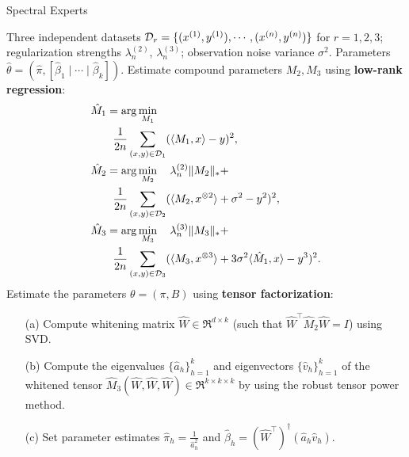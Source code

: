\begin{algorithm}[t]
  \caption{Spectral Experts}
  \label{algo:spectral-experts}
  \begin{algorithmic}[1]
    \INPUT Three independent datasets $\mathcal{D}_r = \{ (x^{(1)}, y^{(1)}), \cdots, (x^{(n)}, y^{(n)}) \}$ for $r = 1, 2, 3$;
    regularization strengths $\lambda_n^{(2)}$, $\lambda_n^{(3)}$;
    observation noise variance $\sigma^2$.
    \OUTPUT Parameters $\hat\theta = (\hat \pi, [\hat \beta_1 \mid \cdots \mid \hat \beta_k])$.
    \STATE Estimate compound parameters $M_2, M_3$ using \textbf{low-rank regression}:
    \begin{align}
      &\hat M_1 = \arg\min_{M_1} \label{eqn:estimateM1} \\
      &\quad\quad\frac{1}{2n} \sum_{(x,y) \in \mathcal{D}_1} (\langle M_1, x \rangle - y)^2, \nonumber \\
      &\hat M_2 = \arg\min_{M_2} \quad \lambda_n^{(2)} \|M_2\|_* + \label{eqn:estimateM2} \\
      &\quad\quad\frac{1}{2n} \sum_{(x,y) \in \mathcal{D}_2} (\langle M_2, x^{\otimes 2} \rangle + \sigma^2 - y^2)^2, \nonumber \\
      &\hat M_3 = \arg\min_{M_3} \quad \lambda_n^{(3)} \|M_3\|_* + \label{eqn:estimateM3} \\
      &\quad\quad\frac{1}{2n} \sum_{(x,y) \in \mathcal{D}_3} (\langle M_3, x^{\otimes 3} \rangle + 3 \sigma^2\langle \hat M_1, x \rangle - y^3)^2. \nonumber
    \end{align}
    \STATE Estimate the parameters $\theta = (\pi, B)$ using \textbf{tensor factorization}:
    \begin{enumerate}
      \item [(a)] Compute whitening matrix $\hat W \in \Re^{d \times k}$ (such that $\hat W^\top
      \hat M_2 \hat W = I$) using SVD.
      \item [(b)] Compute the eigenvalues $\{\hat a_h\}_{h=1}^k$
      and eigenvectors $\{\hat v_h\}_{h=1}^k$
      of the whitened tensor $\hat M_3(\hat W, \hat W, \hat W) \in \Re^{k \times k \times k}$
      by using the robust tensor power method.
    \item [(c)] Set parameter estimates $\hat\pi_h = \frac{1}{\hat a_h^2}$
    and $\hat\beta_h = (\hat W^{\top})^\dagger (\hat a_h \hat v_h)$.
    \end{enumerate}
  \end{algorithmic}
\end{algorithm}

